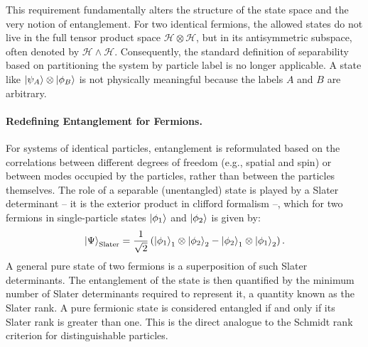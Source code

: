 This requirement fundamentally alters the structure of the state space and the
very notion of entanglement. For two identical fermions, the allowed states do
not live in the full tensor product space $\mathcal{H} \otimes \mathcal{H}$,
but in its antisymmetric subspace, often denoted by
$\mathcal{H} \wedge \mathcal{H}$. Consequently, the standard definition of
separability based on partitioning the system by particle label is no longer
applicable. A state like $\ket{\psi_A} \otimes \ket{\phi_B}$ is not
physically meaningful because the labels $A$ and $B$ are arbitrary.

\paragraph{Redefining Entanglement for Fermions.}
For systems of identical particles, entanglement is reformulated based on the
correlations between different degrees of freedom (e.g., spatial and spin)
or between modes occupied by the particles, rather than between the particles
themselves. The role of a separable (unentangled) state is played by a
Slater determinant -- it is the exterior product in clifford formalism --, which
for two fermions in single-particle states
$\ket{\phi_1}$ and $\ket{\phi_2}$ is given by:
\begin{equation}
	\ket{\Psi}_{\text{Slater}} = \frac{1}{\sqrt{2}}
	\left( \ket{\phi_1}_1 \otimes \ket{\phi_2}_2 -
	\ket{\phi_2}_1 \otimes \ket{\phi_1}_2 \right).
\end{equation}
A general pure state of two fermions is a superposition of such Slater
determinants. The entanglement of the state is then quantified by the minimum
number of Slater determinants required to represent it, a quantity known as
the Slater rank. A pure fermionic state is considered entangled if
and only if its Slater rank is greater than one. This is the direct analogue
to the Schmidt rank criterion for distinguishable particles.

